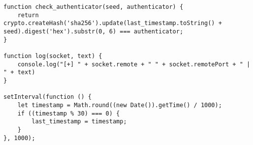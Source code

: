 \begin{lstlisting}[style=JavaScript]
function check_authenticator(seed, authenticator) {
    return crypto.createHash('sha256').update(last_timestamp.toString() + seed).digest('hex').substr(0, 6) === authenticator;
}

function log(socket, text) {
    console.log("[+] " + socket.remote + " " + socket.remotePort + " | " + text)
}

setInterval(function () {
    let timestamp = Math.round((new Date()).getTime() / 1000);
    if ((timestamp % 30) === 0) {
        last_timestamp = timestamp;
    }
}, 1000);
\end{lstlisting}